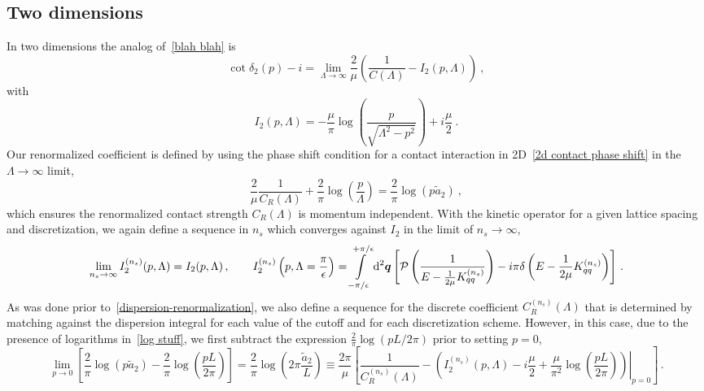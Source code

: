 \subsection{Two dimensions}

In two dimensions the analog of~\eqref{blah blah} is
\begin{equation}
\cot \delta_2(p) - i =\lim_{\Lambda\to\infty}\frac{2}{\mu}\left(\frac{1}{C(\Lambda)}- I_2(p, \Lambda)\right)\ , %
\end{equation}
with
\begin{equation}
I_2(p, \Lambda)
=
-\frac{\mu}{\pi } \log \left(\frac{p}{\sqrt{\Lambda ^2-p^2}}\right)
+ i\frac{\mu }{2}
\ .
\end{equation}
Our renormalized coefficient is defined by using the phase shift condition for a contact interaction in 2D~\eqref{2d contact phase shift} in the $\Lambda\to\infty$ limit,
\begin{equation}\label{eq:log stuff}
	\frac{2}{\mu}\frac{1}{C_R(\Lambda)} + \frac{2}{\pi } \log \left(\frac{p}{\Lambda}\right)
	=
	\frac { 2 } { \pi } \log \left( p \tilde a _ { 2 } \right)\ ,
\end{equation}
which ensures the renormalized contact strength $C_R(\Lambda)$ is momentum independent.
With the kinetic operator for a given lattice spacing and discretization, we again define a sequence in $n_s$ which converges against $I_2$ in the limit of $n_s \to \infty$,
\begin{equation}
	\lim\limits_{n_s \to \infty} I^{(n_s)}_2(p, \Lambda) = I_2(p, \Lambda)
	\, , \qquad
	I^{(n_s)}_2\left(p, \Lambda=\frac{\pi}{\epsilon} \right)
	=
	    \int\limits_{-\pi/\epsilon}^{+\pi/\epsilon}
        \mathrm{d}^2 \boldsymbol{q}
        \left[
            \mathcal{P} \left(
                \frac{1}{
                    E - \frac{1}{2\mu} K_{qq}^{(n_s)} }
                \right)
            -i \pi \delta\left(E - \frac{1}{2\mu}K_{qq}^{(n_s)}\right)
        \right]
        \, .
\end{equation}
As was done prior to~\eqref{dispersion-renormalization}, we also define a sequence for the discrete coefficient $C^{(n_s)}_R(\Lambda)$ that is determined by matching against the dispersion integral for each value of the cutoff and for each discretization scheme.  However, in this case, due to the presence of logarithms in~\eqref{log stuff}, we first subtract the expression $\frac{2}{\pi}\log(pL/2\pi)$ prior to setting $p=0$,
\begin{equation}
	\lim\limits_{p\to 0}
	\left[
		\frac { 2 } { \pi } \log \left( p \tilde a _ { 2 } \right)-\frac{2}{\pi } \log \left(\frac{pL}{2\pi}\right)
	\right]
	=
	\frac { 2 } { \pi } \log \left(2\pi \frac{\tilde a _ { 2 }}{L} \right)
	\equiv
	\frac{2 \pi}{\mu}
		\left[
		\frac{1}{C_R^{(n_s)}(\Lambda)} - \left.\left(I_2^{(n_s)}(p, \Lambda) - i\frac{\mu}{2}+\frac{\mu}{\pi^2} \log \left(\frac{pL}{2\pi}\right)\right)\right|_{p=0}
		\right]
	\, .
\end{equation}
